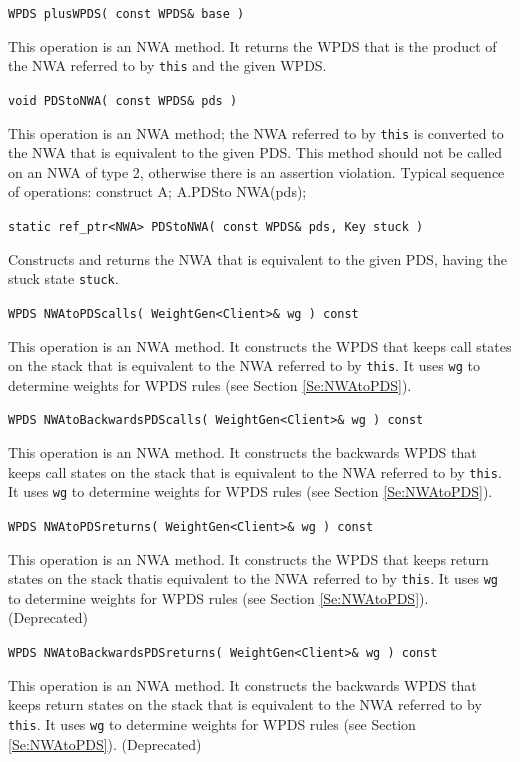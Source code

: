 \documentclass{llncs}
\begin{document}
\begin{description}

  \item\texttt{WPDS plusWPDS( const WPDS\& base )}

    This operation is an NWA method.  It returns the WPDS that is the product of the NWA referred to by \texttt{this} and the given WPDS. \cite{advancedquerying}

  \item\texttt{void PDStoNWA( const WPDS\& pds )}

    This operation is an NWA method; the NWA referred to by \texttt{this} is converted to the NWA that is equivalent to the given PDS.  This method should not be called on an NWA of type 2, otherwise there is an assertion violation.  Typical sequence of operations: construct A; A.PDSto NWA(pds);

  \item\texttt{static ref\_ptr<NWA> PDStoNWA( const WPDS\& pds, Key stuck )}

    Constructs and returns the NWA that is equivalent to the given PDS, having the stuck state \texttt{stuck}.

  \item\texttt{WPDS NWAtoPDScalls( WeightGen<Client>\& wg ) const}

    This operation is an NWA method.  It constructs the WPDS that keeps call states on the stack that is equivalent to the NWA referred to by \texttt{this}.  It uses \texttt{wg} to determine weights for WPDS rules (see Section \ref{Se:NWAtoPDS}).

  \item\texttt{WPDS NWAtoBackwardsPDScalls( WeightGen<Client>\& wg ) const}

    This operation is an NWA method.  It constructs the backwards WPDS that keeps call states on the stack that is equivalent to the NWA referred to by \texttt{this}.  It uses \texttt{wg} to determine weights for WPDS rules (see Section \ref{Se:NWAtoPDS}).

  \item\texttt{WPDS NWAtoPDSreturns( WeightGen<Client>\& wg ) const}

    This operation is an NWA method.  It constructs the WPDS that keeps return states on the stack thatis equivalent to the NWA referred to by \texttt{this}.  It uses \texttt{wg} to determine weights for WPDS rules (see Section \ref{Se:NWAtoPDS}).  (Deprecated)

  \item\texttt{WPDS NWAtoBackwardsPDSreturns( WeightGen<Client>\& wg ) const}

    This operation is an NWA method.  It constructs the backwards WPDS that keeps return states on the stack that is equivalent to the NWA referred to by \texttt{this}.  It uses \texttt{wg} to determine weights for WPDS rules (see Section \ref{Se:NWAtoPDS}).  (Deprecated) \\

\end{description}
\end{document}
